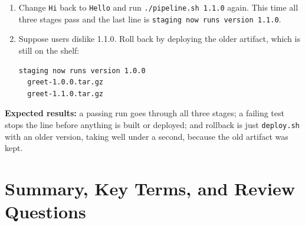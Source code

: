 \begin{enumerate}
  \begin{codeblock}
  \begin{Verbatim}[formatcom=\outputstyle]
  == Stage 1: test
  ======================================================================
  FAIL: test_greet (test_greet.GreetTest.test_greet)
  …
  AssertionError: 'Hi, Asha!' != 'Hello, Asha!'
  …
  FAILED (failures=1)
  1.0.0
  \end{Verbatim}
  \end{codeblock}

  The line stopped at stage 1. No \texttt{1.1.0} artifact was built, and staging still runs \texttt{1.0.0}.
\item
  Change \texttt{Hi} back to \texttt{Hello} and run \texttt{./}\allowbreak{}\texttt{pipeline.sh\ 1.1.0} again. This time all three stages pass and the last line is \texttt{staging\ now\ runs\ version\ 1.}\allowbreak{}\texttt{1.}\allowbreak{}\texttt{0}.
\item
  Suppose users dislike 1.1.0. Roll back by deploying the older artifact, which is still on the shelf:

  \begin{codeblock}

\begin{Shaded}
\begin{Highlighting}[]
\end{Highlighting}
\end{Shaded}

  \end{codeblock}

  \begin{codeblock}
  \begin{Verbatim}[formatcom=\outputstyle]
  staging now runs version 1.0.0
  greet-1.0.0.tar.gz
  greet-1.1.0.tar.gz
  \end{Verbatim}
  \end{codeblock}
\end{enumerate}

\textbf{Expected results:} a passing run goes through all three stages; a failing test stops the line before anything is built or deployed; and rollback is just \texttt{deploy.sh} with an older version, taking well under a second, because the old artifact was kept.

\section{Summary, Key Terms, and Review Questions}\label{04-pipelines-from-a-commit-to-production:summary-key-terms-and-review-questions}

